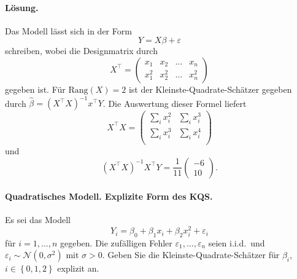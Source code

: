 \paragraph*{Lösung.} Das Modell lässt sich in der Form
\begin{equation*}
    Y = X \beta + \varepsilon
\end{equation*}
schreiben, wobei die Designmatrix durch 
\begin{equation*}
    X^\top = \left(
    \begin{array}{cccc}
        x_1     & x_2   & \ldots & x_n \\
        x_1^2   & x_2^2 & \ldots & x_n^2
    \end{array}
    \right)
\end{equation*} 
gegeben ist. Für $\textrm{Rang}(X) = 2$ ist der Kleinste-Quadrate-Schätzer
gegeben durch $\hat \beta = \left( X^{\top} X \right)^{-1} x^{\top} Y$. Die
Auswertung dieser Formel liefert
\begin{equation*}
    X^\top X = \left(
    \begin{array}{ccc}
        \sum_{i}^{} x_i^2 & \sum_{i}^{} x_i^3 \\
        \sum_{i}^{} x_i^3 & \sum_{i}^{} x_i^4 \\
    \end{array}
    \right)
\end{equation*}
und 
\begin{equation*}
    \left( X^{\top} X \right)^{-1} X^{\top} Y = \frac{1}{11} \left( 
    \begin{matrix}
        -6 \\ 10
    \end{matrix}
    \right).
\end{equation*}




\paragraph{Quadratisches Modell. Explizite Form des KQS.}  Es sei das Modell
\begin{equation*}
    Y_i = \beta_0 + \beta_1 x_i + \beta_2 x_{i}^2 + \varepsilon_i
\end{equation*}
für $i=1,\ldots,n$ gegeben. Die zufälligen Fehler $\varepsilon_1,\ldots,\varepsilon_n$ 
seien i.i.d.\ und $\varepsilon_i\sim \mathcal N(0,\sigma^2)$ mit $\sigma>0$.
Geben Sie die Kleinste-Quadrate-Schätzer für $\beta_i$, $i\in \left\{ 0,1,2 \right\}$ explizit an.

